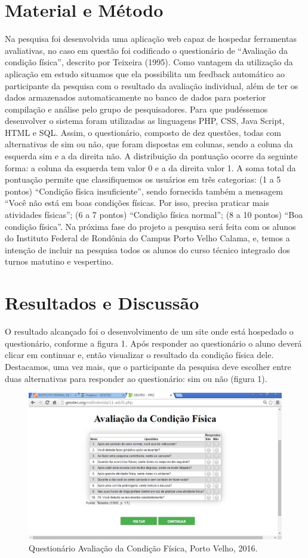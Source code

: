 \documentclass[article,12pt,onesidea,4paper,english,brazil]{abntex2}
\begin{document}
	\section*{Material e Método}
	
	Na pesquisa foi desenvolvida uma aplicação web capaz de hospedar ferramentas avaliativas, no caso em questão foi codificado o questionário de “Avaliação da condição física”, descrito por Teixeira (1995). Como vantagem da utilização da aplicação em estudo situamos que ela possibilita um feedback automático ao participante da pesquisa com o resultado da avaliação individual, além de ter os dados armazenados automaticamente no banco de dados para posterior compilação e análise pelo grupo de pesquisadores.
	Para que pudéssemos desenvolver o sistema foram utilizadas as linguagens PHP, CSS, Java Script, HTML e SQL. Assim, o questionário, composto de dez questões, todas com alternativas de sim ou não, que foram dispostas em colunas, sendo a coluna da esquerda sim e a da direita não. A distribuição da pontuação ocorre da seguinte forma: a coluna da esquerda tem valor 0 e a da direita valor 1. A soma total da pontuação permite que classifiquemos os usuários em três categorias: (1 a 5 pontos) “Condição física insuficiente”, sendo fornecida também a mensagem “Você não está em boas condições físicas. Por isso, precisa praticar mais atividades físicas”; (6 a 7 pontos) “Condição física normal”; (8 a 10 pontos) “Boa condição física”.
	Na próxima fase do projeto a pesquisa será feita com os alunos do Instituto Federal de Rondônia do Campus Porto Velho Calama, e, temos a intenção de incluir na pesquisa todos os alunos do curso técnico integrado dos turnos matutino e vespertino.
	
	\section*{Resultados e Discussão}
	
	O resultado alcançado foi o desenvolvimento de um site onde está hospedado o questionário, conforme a figura 1. Após responder ao questionário o aluno deverá clicar em continuar e, então visualizar o resultado da condição física dele. Destacamos, uma vez mais, que o participante da pesquisa deve escolher entre duas alternativas para responder ao questionário: sim ou não (figura 1).
	
	\begin{figure}[h]
		\centering
		\includegraphics[width=0.4\linewidth]{pip13-1.png}
		\caption{Questionário Avaliação da Condição Física, Porto Velho, 2016.}
	\end{figure}
	
\end{document}
